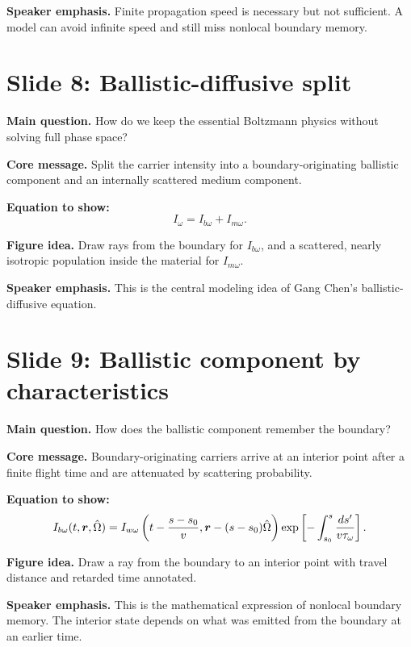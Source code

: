\documentclass[11pt]{article}
\begin{document}
\textbf{Speaker emphasis.} Finite propagation speed is necessary but not sufficient. A model can avoid infinite speed and still miss nonlocal boundary memory.

\section{Slide 8: Ballistic-diffusive split}
\begin{physicsbox}
\textbf{Main question.} How do we keep the essential Boltzmann physics without solving full phase space?
\end{physicsbox}

\textbf{Core message.} Split the carrier intensity into a boundary-originating ballistic component and an internally scattered medium component.

\textbf{Equation to show:}
\begin{equation*}
I_\omega=I_{b\omega}+I_{m\omega}.
\end{equation*}

\textbf{Figure idea.} Draw rays from the boundary for \(I_{b\omega}\), and a scattered, nearly isotropic population inside the material for \(I_{m\omega}\).

\textbf{Speaker emphasis.} This is the central modeling idea of Gang Chen's ballistic-diffusive equation.

\section{Slide 9: Ballistic component by characteristics}
\begin{physicsbox}
\textbf{Main question.} How does the ballistic component remember the boundary?
\end{physicsbox}

\textbf{Core message.} Boundary-originating carriers arrive at an interior point after a finite flight time and are attenuated by scattering probability.

\textbf{Equation to show:}
\begin{equation*}
I_{b\omega}(t,\bm{r},\hat{\Omega})
=I_{w\omega}\left(t-\frac{s-s_0}{v},\bm{r}-(s-s_0)\hat{\Omega}\right)
\exp\left[-\int_{s_0}^{s}\frac{ds'}{v\tau_\omega}\right].
\end{equation*}

\textbf{Figure idea.} Draw a ray from the boundary to an interior point with travel distance and retarded time annotated.

\textbf{Speaker emphasis.} This is the mathematical expression of nonlocal boundary memory. The interior state depends on what was emitted from the boundary at an earlier time.
\end{document}
